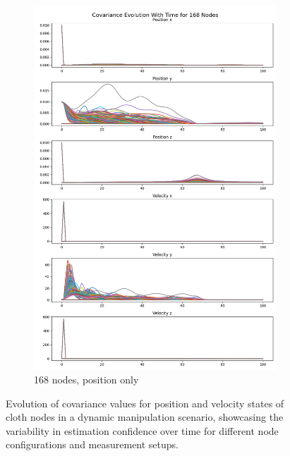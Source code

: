 \begin{figure}
\begin{subfigure}[b]{0.32\linewidth}
        \includegraphics[width=\linewidth]{CLOTH REPORT PICS/covariance 168.jpg}
        \caption{168 nodes, position only}
        \label{fig:covariance-168}
    \end{subfigure}
    \caption{Evolution of covariance values for position and velocity states of cloth nodes in a dynamic manipulation scenario, showcasing the variability in estimation confidence over time for different node configurations and measurement setups.}
    \label{fig:covariances}
\end{figure}

